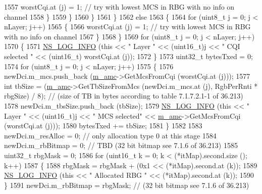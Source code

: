 \begin{DoxyCode}
1557                       worstCqi.at (j) = 1; \textcolor{comment}{// try with lowest MCS in RBG with no info on channel}
1558                     \}
1559                 \}
1560             \}
1561         \}
1562       \textcolor{keywordflow}{else}
1563         \{
1564           \textcolor{keywordflow}{for} (uint8\_t j = 0; j < nLayer; j++)
1565             \{
1566               worstCqi.at (j) = 1; \textcolor{comment}{// try with lowest MCS in RBG with no info on channel}
1567             \}
1568         \}
1569       \textcolor{keywordflow}{for} (uint8\_t j = 0; j < nLayer; j++)
1570         \{
1571           \hyperlink{group__logging_gafbd73ee2cf9f26b319f49086d8e860fb}{NS\_LOG\_INFO} (\textcolor{keyword}{this} << \textcolor{stringliteral}{" Layer "} << (uint16\_t)j << \textcolor{stringliteral}{" CQI selected "} << (uint16\_t)
      worstCqi.at (j));
1572         \}
1573       uint32\_t bytesTxed = 0;
1574       \textcolor{keywordflow}{for} (uint8\_t j = 0; j < nLayer; j++)
1575         \{
1576           newDci.m\_mcs.push\_back (\hyperlink{classns3_1_1PssFfMacScheduler_a0cbf5421430268701ab8a313ab912785}{m\_amc}->GetMcsFromCqi (worstCqi.at (j)));
1577           \textcolor{keywordtype}{int} tbSize = (\hyperlink{classns3_1_1PssFfMacScheduler_a0cbf5421430268701ab8a313ab912785}{m\_amc}->GetTbSizeFromMcs (newDci.m\_mcs.at (j), RgbPerRnti * rbgSize) / 8); \textcolor{comment}{//
       (size of TB in bytes according to table 7.1.7.2.1-1 of 36.213)}
1578           newDci.m\_tbsSize.push\_back (tbSize);
1579           \hyperlink{group__logging_gafbd73ee2cf9f26b319f49086d8e860fb}{NS\_LOG\_INFO} (\textcolor{keyword}{this} << \textcolor{stringliteral}{" Layer "} << (uint16\_t)j << \textcolor{stringliteral}{" MCS selected"} << 
      \hyperlink{classns3_1_1PssFfMacScheduler_a0cbf5421430268701ab8a313ab912785}{m\_amc}->GetMcsFromCqi (worstCqi.at (j)));
1580           bytesTxed += tbSize;
1581         \}
1582 
1583       newDci.m\_resAlloc = 0;  \textcolor{comment}{// only allocation type 0 at this stage}
1584       newDci.m\_rbBitmap = 0; \textcolor{comment}{// TBD (32 bit bitmap see 7.1.6 of 36.213)}
1585       uint32\_t rbgMask = 0;
1586       \textcolor{keywordflow}{for} (uint16\_t k = 0; k < (*itMap).second.size (); k++)
1587         \{
1588           rbgMask = rbgMask + (0x1 << (*itMap).second.at (k));
1589           \hyperlink{group__logging_gafbd73ee2cf9f26b319f49086d8e860fb}{NS\_LOG\_INFO} (\textcolor{keyword}{this} << \textcolor{stringliteral}{" Allocated RBG "} << (*itMap).second.at (k));
1590         \}
1591       newDci.m\_rbBitmap = rbgMask; \textcolor{comment}{// (32 bit bitmap see 7.1.6 of 36.213)}

\end{DoxyCode}
